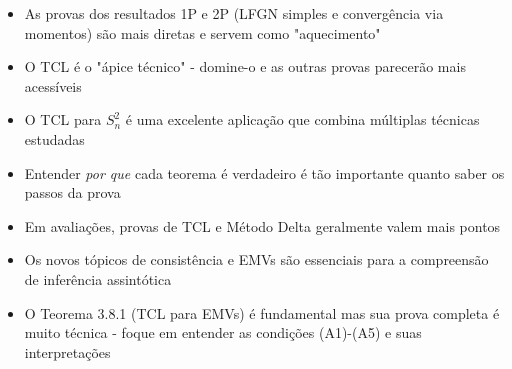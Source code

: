 \documentclass[12pt,a4paper]{article}
\theoremstyle{plain}
\theoremstyle{definition}
\theoremstyle{remark}
\begin{document}
\begin{itemize}
    \item As provas dos resultados 1P e 2P (LFGN simples e convergência via momentos) são mais diretas e servem como "aquecimento"
    
    \item O TCL é o "ápice técnico" - domine-o e as outras provas parecerão mais acessíveis
    
    \item O TCL para $S_n^2$ é uma excelente aplicação que combina múltiplas técnicas estudadas
    
    \item Entender \emph{por que} cada teorema é verdadeiro é tão importante quanto saber os passos da prova
    
    \item Em avaliações, provas de TCL e Método Delta geralmente valem mais pontos
    
    \item Os novos tópicos de consistência e EMVs são essenciais para a compreensão de inferência assintótica
    
    \item O Teorema 3.8.1 (TCL para EMVs) é fundamental mas sua prova completa é muito técnica - foque em entender as condições (A1)-(A5) e suas interpretações
\end{itemize}
\end{document}
